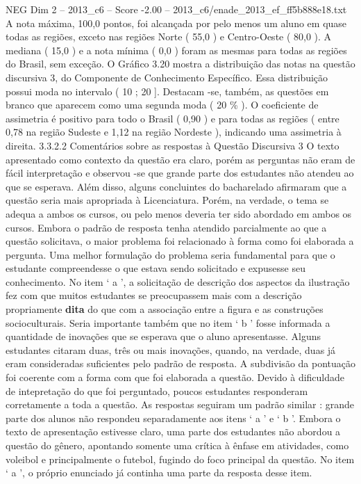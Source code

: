\begin{textsample}{NEG Dim 2 – 2013\_c6 – Score -2.00 – 2013\_c6/enade\_2013\_ef\_ff5b888e18.txt}
A nota máxima, 100,0 pontos, foi alcançada por pelo menos um aluno em quase todas as regiões, exceto nas regiões Norte ( 55,0 ) e Centro-Oeste ( 80,0 ).
A mediana ( 15,0 ) e a nota mínima ( 0,0 ) foram as mesmas para todas as regiões do Brasil, sem exceção.
O Gráfico 3.20 mostra a distribuição das notas na questão discursiva 3, do Componente de Conhecimento Específico.
Essa distribuição possui moda no intervalo ( 10 ; 20 ].
Destacam -se, também, as questões em branco que aparecem como uma segunda moda ( 20 \% ).
O coeficiente de assimetria é positivo para todo o Brasil ( 0,90 ) e para todas as regiões ( entre 0,78 na região Sudeste e 1,12 na região Nordeste ), indicando uma assimetria à direita. 3.3.2.2 Comentários sobre as respostas à Questão Discursiva 3 O texto apresentado como contexto da questão era claro, porém as perguntas não eram de fácil interpretação e observou -se que grande parte dos estudantes não atendeu ao que se esperava.
Além disso, alguns concluintes do bacharelado afirmaram que a questão seria mais apropriada à Licenciatura.
Porém, na verdade, o tema se adequa a ambos os cursos, ou pelo menos deveria ter sido abordado em ambos os cursos.
Embora o padrão de resposta tenha atendido parcialmente ao que a questão solicitava, o maior problema foi relacionado à forma como foi elaborada a pergunta.
Uma melhor formulação do problema seria fundamental para que o estudante compreendesse o que estava sendo solicitado e expusesse seu conhecimento.
No item ‘ a ’, a solicitação de descrição dos aspectos da ilustração fez com que muitos estudantes se preocupassem mais com a descrição propriamente \textbf{dita} do que com a associação entre a figura e as construções socioculturais.
Seria importante também que no item ‘ b ’ fosse informada a quantidade de inovações que se esperava que o aluno apresentasse.
Alguns estudantes citaram duas, três ou mais inovações, quando, na verdade, duas já eram consideradas suficientes pelo padrão de resposta.
A subdivisão da pontuação foi coerente com a forma com que foi elaborada a questão.
Devido à dificuldade de intepretação do que foi perguntado, poucos estudantes responderam corretamente a toda a questão.
As respostas seguiram um padrão similar : grande parte dos alunos não respondeu separadamente aos itens ‘ a ’ e ‘ b ’.
Embora o texto de apresentação estivesse claro, uma parte dos estudantes não abordou a questão do gênero, apontando somente uma crítica à ênfase em atividades, como voleibol e principalmente o futebol, fugindo do foco principal da questão.
No item ‘ a ’, o próprio enunciado já continha uma parte da resposta desse item.

\end{textsample}
